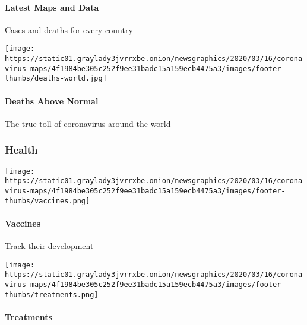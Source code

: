 \hypertarget{latest-maps-and-data-1}{%
\paragraph{Latest Maps and Data}\label{latest-maps-and-data-1}}

Cases and deaths for every country

\href{https://www.nytimes3xbfgragh.onion/interactive/2020/04/21/world/coronavirus-missing-deaths.html}{}

\texttt{[image: https://static01.graylady3jvrrxbe.onion/newsgraphics/2020/03/16/coronavirus-maps/4f1984be305c252f9ee31badc15a159ecb4475a3/images/footer-thumbs/deaths-world.jpg]}

\hypertarget{deaths-above-normal-1}{%
\paragraph{Deaths Above Normal}\label{deaths-above-normal-1}}

The true toll of coronavirus around the world

\hypertarget{health}{%
\subsubsection{Health}\label{health}}

\href{https://www.nytimes3xbfgragh.onion/interactive/2020/science/coronavirus-vaccine-tracker.html}{}

\texttt{[image: https://static01.graylady3jvrrxbe.onion/newsgraphics/2020/03/16/coronavirus-maps/4f1984be305c252f9ee31badc15a159ecb4475a3/images/footer-thumbs/vaccines.png]}

\hypertarget{vaccines}{%
\paragraph{Vaccines}\label{vaccines}}

Track their development

\href{https://www.nytimes3xbfgragh.onion/interactive/2020/science/coronavirus-drugs-treatments.html}{}

\texttt{[image: https://static01.graylady3jvrrxbe.onion/newsgraphics/2020/03/16/coronavirus-maps/4f1984be305c252f9ee31badc15a159ecb4475a3/images/footer-thumbs/treatments.png]}

\hypertarget{treatments}{%
\paragraph{Treatments}\label{treatments}}

